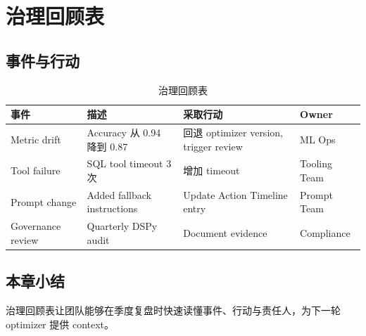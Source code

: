 \section{治理回顾表}

\subsection{事件与行动}

\begin{table}[H]
\centering
\caption{治理回顾表}
\begin{tabular}{p{}p{}p{}p{}}
\toprule
事件 & 描述 & 采取行动 & Owner \\
\midrule
Metric drift & Accuracy 从 0.94 降到 0.87 & 回退 optimizer version, trigger review & ML Ops \\
Tool failure & SQL tool timeout 3 次 & 增加 timeout & Tooling Team \\
Prompt change & Added fallback instructions & Update Action Timeline entry & Prompt Team \\
Governance review & Quarterly DSPy audit & Document evidence & Compliance \\
\bottomrule
\end{tabular}
\end{table}

\subsection{本章小结}

治理回顾表让团队能够在季度复盘时快速读懂事件、行动与责任人，为下一轮 optimizer 提供 context。

